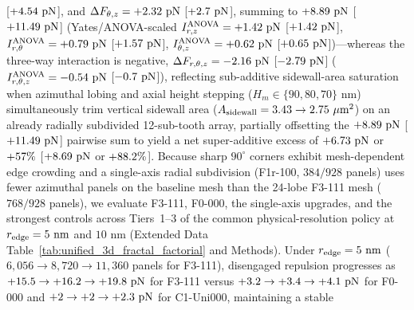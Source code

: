 \documentclass[pdflatex,sn-nature]{sn-jnl}
\DeclareRobustCommand{\roundone}[1]{\fpeval{round(#1,1)}}
\DeclareRobustCommand{\roundtwo}[1]{\fpeval{round(#1,2)}}
\begin{document}
[$+\roundtwo{\NthreeIsothreezerofournineSynergyRThetaPn}\text{ pN}$], and $\Delta F_{\theta,z} = +\roundtwo{\NthreeUnithreedSynergyThetaZPn}\text{ pN}$ [$+\roundtwo{\NthreeIsothreezerofournineSynergyThetaZPn}\text{ pN}$], summing to $+\roundtwo{\NthreeUnithreedPairwiseSynergySumPn}\text{ pN}$ [$+\roundtwo{\NthreeIsothreezerofourninePairwiseSynergySumPn}\text{ pN}$] (Yates/ANOVA-scaled $I_{r,z}^{\rm ANOVA} = +\roundtwo{\NthreeUnithreedAnovaIntRZPn}\text{ pN}$ [$+\roundtwo{\NthreeIsothreezerofournineAnovaIntRZPn}\text{ pN}$], $I_{r,\theta}^{\rm ANOVA} = +\roundtwo{\NthreeUnithreedAnovaIntRThetaPn}\text{ pN}$ [$+\roundtwo{\NthreeIsothreezerofournineAnovaIntRThetaPn}\text{ pN}$], $I_{\theta,z}^{\rm ANOVA} = +\roundtwo{\NthreeUnithreedAnovaIntThetaZPn}\text{ pN}$ [$+\roundtwo{\NthreeIsothreezerofournineAnovaIntThetaZPn}\text{ pN}$])---whereas the three-way interaction is negative, $\Delta F_{r,\theta,z} = \roundtwo{\NthreeUnithreedSynergyThreewayPn}\text{ pN}$ [$\roundtwo{\NthreeIsothreezerofournineSynergyThreewayPn}\text{ pN}$] ($I_{r,\theta,z}^{\rm ANOVA} = \roundtwo{\NthreeUnithreedAnovaIntThreewayPn}\text{ pN}$ [$\roundtwo{\NthreeIsothreezerofournineAnovaIntThreewayPn}\text{ pN}$]), reflecting sub-additive sidewall-area saturation when azimuthal lobing and axial height stepping ($H_m \in \{90, 80, 70\}\text{ nm}$) simultaneously trim vertical sidewall area ($A_{\rm sidewall} = \roundtwo{\NthreeUnithreedFoneonezeroRthetaPlanarAswUmtwo} \to \roundtwo{\NthreeUnithreedFoneoneoneUnifiedAswUmtwo}\ \mu\text{m}^2$) on an already radially subdivided 12-sub-tooth array, partially offsetting the $+\roundtwo{\NthreeUnithreedPairwiseSynergySumPn}\text{ pN}$ [$+\roundtwo{\NthreeIsothreezerofourninePairwiseSynergySumPn}\text{ pN}$] pairwise sum to yield a net super-additive excess of $+\roundtwo{\NthreeUnithreedSuperadditiveExcessPn}\text{ pN}$ or $+\roundone{\NthreeUnithreedSuperadditiveExcessPct}\%$ [$+\roundtwo{\NthreeIsothreezerofournineSuperadditiveExcessPn}\text{ pN}$ or $+\roundone{\NthreeIsothreezerofournineSuperadditiveExcessPct}\%$]. Because sharp $90^\circ$ corners exhibit mesh-dependent edge crowding and a single-axis radial subdivision (F1r-100, $384/928$ panels) uses fewer azimuthal panels on the baseline mesh than the 24-lobe F3-111 mesh ($768/928$ panels), we evaluate F3-111, F0-000, the single-axis upgrades, and the strongest controls across Tiers~1--3 of the common physical-resolution policy at $r_{\rm edge} = 5\text{ nm}$ and $10\text{ nm}$ (Extended Data Table~\ref{tab:unified_3d_fractal_factorial} and Methods). Under $r_{\rm edge} = 5\text{ nm}$ ($6{,}056 \to 8{,}720 \to 11{,}360$ panels for F3-111), disengaged repulsion progresses as $+\roundone{\NthreeMtFoneoneoneUnifiedRfivenmToneFzPn} \to +\roundone{\NthreeMtFoneoneoneUnifiedRfivenmTtwoFzPn} \to +\roundone{\NthreeMtFoneoneoneUnifiedRfivenmTthreeFzPn}\text{ pN}$ for F3-111 versus $+\roundone{\NthreeMtFzerozerozeroRfivenmToneFzPn} \to +\roundone{\NthreeMtFzerozerozeroRfivenmTtwoFzPn} \to +\roundone{\NthreeMtFzerozerozeroRfivenmTthreeFzPn}\text{ pN}$ for F0-000 and $+\roundone{\NthreeMtCtrlUnizerozerozeroRfivenmToneFzPn} \to +\roundone{\NthreeMtCtrlUnizerozerozeroRfivenmTtwoFzPn} \to +\roundone{\NthreeMtCtrlUnizerozerozeroRfivenmTthreeFzPn}\text{ pN}$ for C1-Uni000, maintaining a stable 
\end{document}
